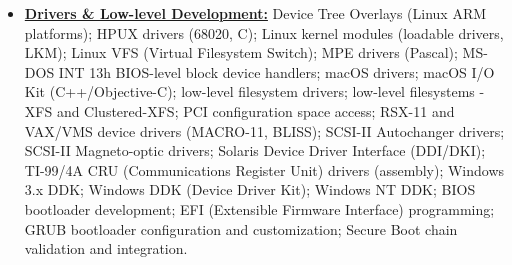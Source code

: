 \documentclass[letterpaper,11pt]{article}
\begin{document}
\begin{multicols}{4}
{\begin{itemize}[leftmargin=0.1in, label={}, itemsep=0pt, parsep=0pt, topsep=0pt, partopsep=0pt]
\item
\textbf{\uline{Drivers \& Low-level Development:}} \hspace{0pt}
Device Tree Overlays (Linux ARM platforms);
HPUX drivers (68020, C);
Linux kernel modules (loadable drivers, LKM);
Linux VFS (Virtual Filesystem Switch);
MPE drivers (Pascal);
MS-DOS INT 13h BIOS-level block device handlers;
macOS drivers;
macOS I/O Kit (C++/Objective-C);
low-level filesystem drivers;
low-level filesystems - XFS and Clustered-XFS;
PCI configuration space access;
RSX-11 and VAX/VMS device drivers (MACRO-11, BLISS);
SCSI-II Autochanger drivers;
SCSI-II Magneto-optic drivers;
Solaris Device Driver Interface (DDI/DKI);
TI-99/4A CRU (Communications Register Unit) drivers (assembly);
Windows 3.x DDK;
Windows DDK (Device Driver Kit);
Windows NT DDK;
BIOS bootloader development;
EFI (Extensible Firmware Interface) programming;
GRUB bootloader configuration and customization;
Secure Boot chain validation and integration.


\end{itemize}}
\end{multicols}
\end{document}

